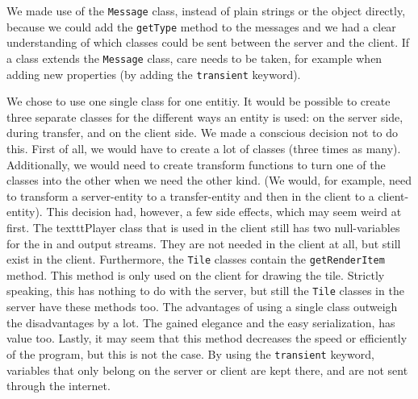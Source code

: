 \documentclass[../main.tex]{subfiles}
\begin{document}
    We made use of the \texttt{Message} class, instead of plain strings or the object directly, because we could add the \texttt{getType} method to the messages and we had a clear understanding of which classes could be sent between the server and the client. If a class extends the \texttt{Message} class, care needs to be taken, for example when adding new properties (by adding the \texttt{transient} keyword).
    
    We chose to use one single class for one entitiy. It would be possible to create three separate classes for the different ways an entity is used: on the server side, during transfer, and on the client side. We made a conscious decision not to do this. First of all, we would have to create a lot of classes (three times as many). Additionally, we would need to create transform functions to turn one of the classes into the other when we need the other kind. (We would, for example, need to transform a server-entity to a transfer-entity and then in the client to a client-entity). This decision had, however, a few side effects, which may seem weird at first. The texttt{Player} class that is used in the client still has two null-variables for the in and output streams. They are not needed in the client at all, but still exist in the client. Furthermore, the \texttt{Tile} classes contain the \texttt{getRenderItem} method. This method is only used on the client for drawing the tile. Strictly speaking, this has nothing to do with the server, but still the \texttt{Tile} classes in the server have these methods too. The advantages of using a single class outweigh the disadvantages by a lot. The gained elegance and the easy serialization, has value too. Lastly, it may seem that this method decreases the speed or efficiently of the program, but this is not the case. By  using the \texttt{transient} keyword, variables that only belong on the server or client are kept there, and are not sent through the internet.    
\end{document}
